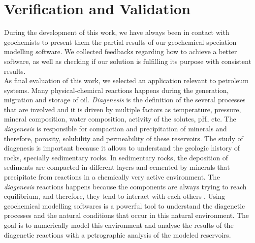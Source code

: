 
\chapter{Verification and Validation}

During the development of this work, we have always been in contact with geochemists to present them the partial results of our geochemical speciation modelling software. We collected feedbacks regarding how to achieve a better software, as well as checking if our solution is fulfilling its purpose with consistent results. \\
As final evaluation of this work, we selected an application relevant to petroleum systems. Many physical-chemical reactions happens during the generation, migration and storage of oil. \emph{Diagenesis} is the definition of the several processes that are involved and it is driven by multiple factors as temperature, pressure, mineral composition, water composition, activity of the solutes, pH, etc. 
The \emph{diagenesis} is responsible for compaction and precipitation of minerals \cite{Tucker:01} and therefore, porosity, solubility and permeability of these reservoirs. The study of diagenesis is important because it allows to understand the geologic history of rocks, specially sedimentary rocks. In sedimentary rocks, the deposition of sediments are compacted in different layers and cemented by minerals that precipitate from reactions in a chemically very active environment. The \emph{diagenesis} reactions happens because the components are always trying to reach equilibrium, and therefore, they tend to interact with each others \cite{Burley:85}.
Using geochemical modelling softwares is a powerful tool to understand the diagenetic processes and the natural conditions that occur in this natural environment. The goal is to numerically model this environment and analyse the results of the diagenetic reactions with a petrographic analysis of the modeled reservoirs.

